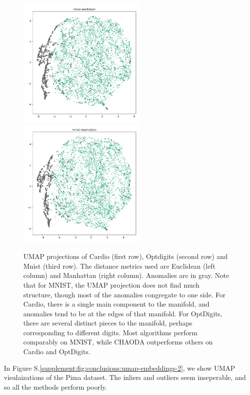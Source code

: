\documentclass{article}
\begin{document}
\begin{figure}
   \includegraphics[width=2.5in]{images/umaps/mnist-euclidean-umap2d.png}
   \includegraphics[width=2.5in]{images/umaps/mnist-manhattan-umap2d.png}
   \caption{UMAP projections of Cardio (first row), Optdigits (second row) and Mnist (third row).
   The distance metrics used are Euclidean (left column) and Manhattan (right column).
   Anomalies are in gray.
   Note that for MNIST, the UMAP projection does not find much structure, though most of the anomalies congregate to one side.
   For Cardio, there is a single main component to the manifold, and anomalies tend to be at the edges of that manifold.
   For OptDigits, there are several distinct pieces to the manifold, perhaps corresponding to different digits.
   Most algorithms perform comparably on MNIST, while CHAODA outperforms others on Cardio and OptDigits.}
   \label{supplement:fig:conclusions:umap-embeddings-1}
\end{figure}

In Figure S.\ref{supplement:fig:conclusions:umap-embeddings-2}, we show UMAP visulaizations of the Pima dataset.
The inliers and outliers seem inseperable, and so all the methods perform poorly.
\end{document}
